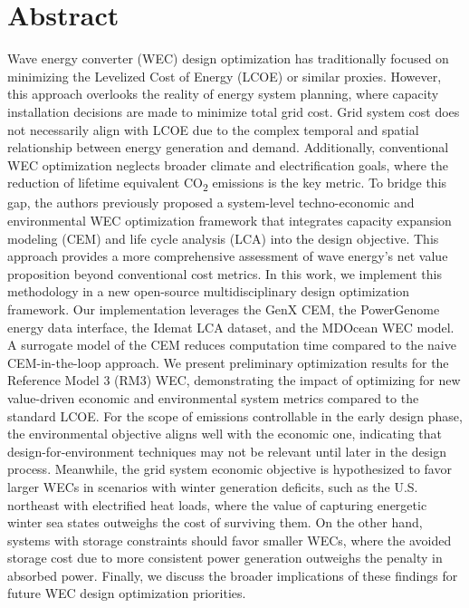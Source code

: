 \documentclass[10pt,twoside]{article}
\begin{document}
\section*{Abstract}
Wave energy converter (WEC) design optimization has traditionally focused on minimizing the Levelized Cost of Energy (LCOE) or similar proxies.
However, this approach overlooks the reality of energy system planning, where capacity installation decisions are made to minimize total grid cost.
Grid system cost does not necessarily align with LCOE due to the complex temporal and spatial relationship between energy generation and demand.
Additionally, conventional WEC optimization neglects broader climate and electrification goals, where the reduction of lifetime equivalent CO\textsubscript{2} emissions is the key metric.
To bridge this gap, the authors previously proposed a system-level techno-economic and environmental WEC optimization framework that integrates capacity expansion modeling (CEM) and life cycle analysis (LCA) into the design objective.
This approach provides a more comprehensive assessment of wave energy's net value proposition beyond conventional cost metrics.
In this work, we implement this methodology in a new open-source multidisciplinary design optimization framework.
Our implementation leverages the GenX CEM, the PowerGenome energy data interface, the Idemat LCA dataset, and the MDOcean WEC model.
A surrogate model of the CEM reduces computation time compared to the naive CEM-in-the-loop approach.
We present preliminary optimization results for the Reference Model 3 (RM3) WEC, demonstrating the impact of optimizing for new value-driven economic and environmental system metrics compared to the standard LCOE.
For the scope of emissions controllable in the early design phase, the environmental objective aligns well with the economic one, indicating that design-for-environment techniques may not be relevant until later in the design process.
Meanwhile, the grid system economic objective is hypothesized to favor larger WECs in scenarios with winter generation deficits, such as the U.S. northeast with electrified heat loads, where the value of capturing energetic winter sea states outweighs the cost of surviving them.
On the other hand, systems with storage constraints should favor smaller WECs, where the avoided storage cost due to more consistent power generation outweighs the penalty in absorbed power.
Finally, we discuss the broader implications of these findings for future WEC design optimization priorities.
 \hfill 
\end{document}
